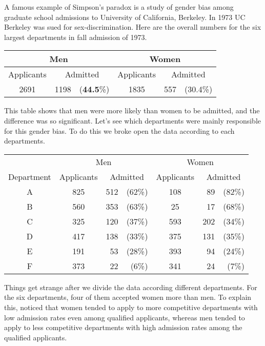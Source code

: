 \begin{example}
A famous example of Simpson's
paradox is a study of gender bias among graduate school admissions to
University of California, Berkeley. In 1973 UC Berkeley was sued for
sex-discrimination. Here are the overall numbers for the six largest
departments in fall admission of 1973.

\begin{center}
  \begin{tabular}{crrcrr}\hline
    \multicolumn{3}{c}{Men} & \multicolumn{3}{c}{Women} \\\hline
    Applicants & \multicolumn{2}{c}{Admitted} & Applicants
                                      & \multicolumn{2}{c}{Admitted} \\\hline
    2691 & 1198 & ({\bf 44.5}\%) & 1835 & 557 & (30.4\%) \\\hline
  \end{tabular}
\end{center}

This table shows that men were more likely than women to be admitted,
and the difference was so significant. Let's see which departments
were mainly responsible for this gender bias. To do this we broke open
the data according to each departments.

\begin{center}
\begin{tabular}{ccrrcrr}\hline
  & \multicolumn{3}{c}{Men}  & \multicolumn{3}{c}{Women} \\\cline{2-7}
  Department & Applicants  & \multicolumn{2}{c}{Admitted} & Applicants
                           & \multicolumn{2}{c}{Admitted} \\\hline
A & 825 & 512& (62\%) & 108 & 89 &(82\%)  \\ 
B & 560 & 353& (63\%) & 25  & 17 &(68\%)  \\
C & 325 & 120& (37\%) & 593 & 202& (34\%) \\
D & 417 & 138& (33\%) & 375 & 131& (35\%) \\
E & 191 & 53 & (28\%) & 393 & 94 &(24\%)  \\
F & 373 & 22 & (6\%) & 341 & 24 &(7\%)  \\\hline
\end{tabular}
\end{center}

Things get strange after we divide the data according different
departments. For the six departments, four of them accepted women more
than men.  To explain this, \cite{bickel1975sex} noticed that women
tended to apply to more competitive departments with low admission
rates even among qualified applicants, whereas men tended to apply to
less competitive departments with high admission rates among the
qualified applicants.
\end{example}

